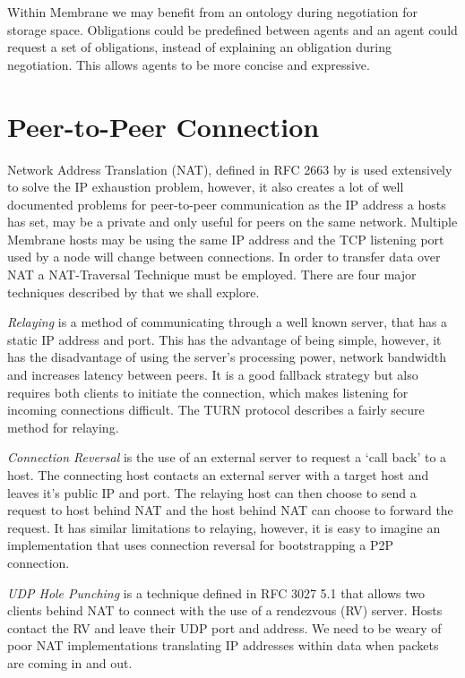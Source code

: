 \documentclass[11pt, a4paper, twoside]{report}
\begin{document}
Within Membrane we may benefit from an ontology during negotiation for storage space. Obligations could be predefined between agents and an agent could request a set of obligations, instead of explaining an obligation during negotiation. This allows agents to be more concise and expressive.

\section{Peer-to-Peer Connection} \label{sec:p2pconn}

Network Address Translation (NAT), defined in RFC 2663 by \cite{srisuresh1999ip} is used extensively to solve the IP exhaustion problem, however, it also creates a lot of well documented problems for peer-to-peer communication as the IP address a hosts has set, may be a private and only useful for peers on the same network. Multiple Membrane hosts may be using the same IP address and the TCP listening port used by a node will change between connections. In order to transfer data over NAT a NAT-Traversal Technique must be employed. There are four major techniques described by \cite{ford2005peer} that we shall explore.

\emph{Relaying} is a method of communicating through a well known server, that has a static IP address and port. This has the advantage of being simple, however, it has the disadvantage of using the server's processing power, network bandwidth and increases latency between peers. It is a good fallback strategy but also requires both clients to initiate the connection, which makes listening for incoming connections difficult. The TURN protocol \citep{rosenberg2005traversal} describes a fairly secure method for relaying.

\emph{Connection Reversal} is the use of an external server to request a `call back' to a host. The connecting host contacts an external server with a target host and leaves it's public IP and port. The relaying host can then choose to send a request to host behind NAT and the host behind NAT can choose to forward the request. It has similar limitations to relaying, however, it is easy to imagine an implementation that uses connection reversal for bootstrapping a P2P connection.

\emph{UDP Hole Punching} is a technique defined in RFC 3027 5.1 \citep{holdrege2001rfc} that allows two clients behind NAT to connect with the use of a rendezvous (RV) server. Hosts contact the RV and leave their UDP port and address. We need to be weary of poor NAT implementations translating IP addresses within data when packets are coming in and out. \citep{ford2005peer}
\end{document}
